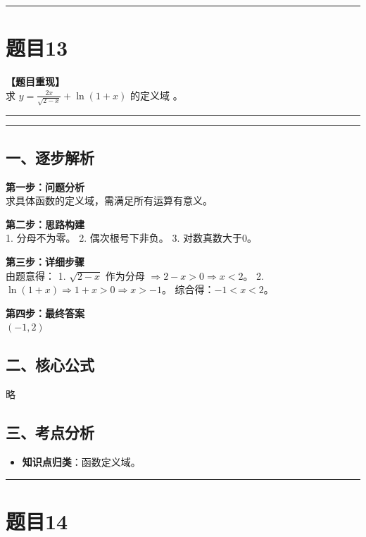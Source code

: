 \documentclass[12pt, a4paper]{ctexart}
\newcommand{\TopSeparator}{
    \par\noindent\rule{\textwidth}{1.5pt}\vspace{0.5em} %
}
\newcommand{\AnalysisSeparator}{
    \par\noindent\rule{\textwidth}{0.5pt}\vspace{0.2em}\hrule\vspace{0.5em} %
}
\newenvironment{RedAnalysis}{
    \par
    \color{red} %
}{
    \par
    \color{black} %
}
\begin{document}
\TopSeparator
\section*{题目13}

\textbf{【题目重现】} \\
求 $ y=\frac{2x}{\sqrt{2-x}}+\ln(1+x) $ 的定义域 \underline{\hspace{2cm}}。

\AnalysisSeparator

\begin{RedAnalysis}

\subsection*{一、逐步解析}

\textbf{第一步：问题分析} \\
求具体函数的定义域，需满足所有运算有意义。

\textbf{第二步：思路构建} \\
1. 分母不为零。
2. 偶次根号下非负。
3. 对数真数大于0。

\textbf{第三步：详细步骤} \\
由题意得：
1. $\sqrt{2-x}$ 作为分母 $\Rightarrow 2-x > 0 \Rightarrow x < 2$。
2. $\ln(1+x) \Rightarrow 1+x > 0 \Rightarrow x > -1$。
综合得：$-1 < x < 2$。

\textbf{第四步：最终答案} \\
$(-1, 2)$

\subsection*{二、核心公式}
略

\subsection*{三、考点分析}
\begin{itemize}
    \item \textbf{知识点归类}：函数定义域。
\end{itemize}

\end{RedAnalysis}

\vspace{2em}

\TopSeparator
\section*{题目14}
\end{document}
